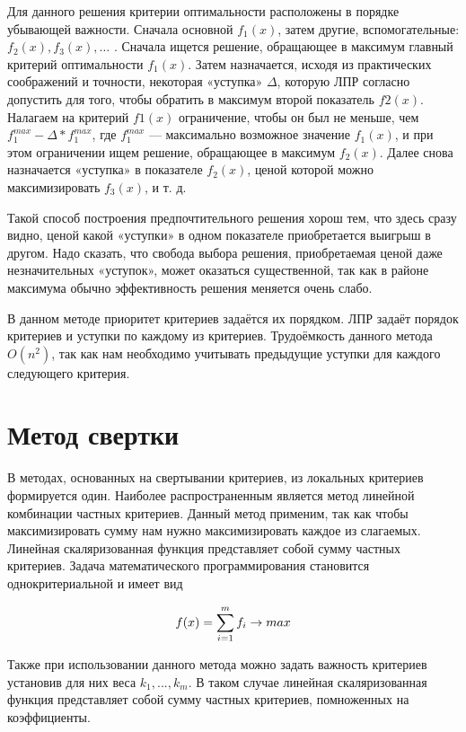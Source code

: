 \documentclass[a4paper,14pt]{report}
\begin{document}
Для данного решения критерии оптимальности расположены в порядке убывающей важности. Сначала основной $f_1(x)$, затем другие, вспомогательные: $f_2(x), f_3(x), …$ . Сначала ищется решение, обращающее в максимум главный критерий оптимальности $f_1(x)$.  Затем назначается, исходя из практических соображений и точности, некоторая «уступка» $\Delta$, которую ЛПР согласно допустить для того, чтобы обратить в максимум второй показатель $f2(x)$. Налагаем на критерий $f1(x)$ ограничение, чтобы он был не меньше, чем $f^{max}_1 - \Delta * f^{max}_1$, где $f^{max}_1$ --- максимально возможное значение $f_1(x)$, и при этом ограничении ищем решение, обращающее в максимум $f_2(x)$. Далее снова назначается «уступка» в показателе $f_2(x)$, ценой которой можно максимизировать $f_3(x)$, и т. д.

Такой способ построения предпочтительного решения хорош тем, что здесь сразу видно, ценой какой «уступки» в одном показателе приобретается выигрыш в другом. Надо сказать, что свобода выбора решения, приобретаемая ценой даже незначительных «уступок», может оказаться существенной, так как в районе максимума обычно эффективность решения меняется очень слабо.

В данном методе приоритет критериев задаётся их порядком. ЛПР задаёт порядок критериев и уступки по каждому из критериев. Трудоёмкость данного метода $O(n^2)$, так как нам необходимо учитывать предыдущие уступки для каждого следующего критерия. 

\section{Метод свертки}
В методах, основанных на свертывании критериев, из локальных критериев формируется один. Наиболее распространенным является метод линейной комбинации частных критериев. Данный метод применим, так как чтобы максимизировать сумму нам нужно максимизировать каждое из слагаемых. Линейная скаляризованная функция представляет собой сумму частных критериев. Задача математического программирования становится однокритериальной и имеет вид


\begin{equation}
f(x) = \sum\limits_{i=1}^m f_i \rightarrow max \\
\label{ref:func}
\end{equation}


Также при использовании данного метода можно задать важность критериев установив для них веса $k_1 , ... , k_m$. В таком случае линейная скаляризованная функция представляет собой сумму частных критериев, помноженных на коэффициенты.
\end{document}
